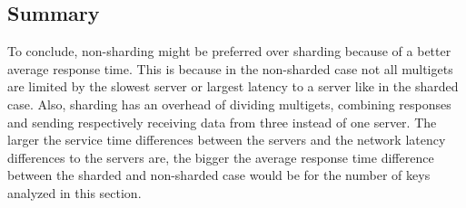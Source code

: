 \subsection{Summary}
To conclude, non-sharding might be preferred over sharding because of a better average response time. This is because in the non-sharded case not all multigets are limited by the slowest server or largest latency to a server like in the sharded case. Also, sharding has an overhead of dividing multigets, combining responses and sending respectively receiving data from three instead of one server. The larger the service time differences between the servers and the network latency differences to the servers are, the bigger the average response time difference between the sharded and non-sharded case would be for the number of keys analyzed in this section.